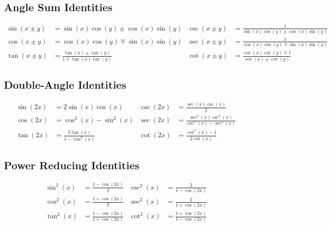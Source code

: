 \documentclass{article}
\begin{document}
\subsection{Angle Sum Identities}
\begin{align*}
	\sin{\left( x\pm y \right)} &= \sin{\left( x \right)} \cos{\left( y \right)} \pm \cos{\left( x \right)} \sin{\left( y \right)}           & \csc{\left( x\pm y \right)} &= \frac{1}{\sin{\left( x \right)} \cos{\left( y \right)} \pm \cos{\left( x \right)} \sin{\left( y \right)}} \\
	\cos{\left( x\pm y \right)} &= \cos{\left( x \right)} \cos{\left( y \right)} \mp \sin{\left( x \right)} \sin{\left( y \right)}           & \sec{\left( x\pm y \right)} &= \frac{1}{\cos{\left( x \right)} \cos{\left( y \right)} \mp \sin{\left( x \right)} \sin{\left( y \right)}} \\
	\tan{\left( x\pm y \right)} &= \frac{\tan{\left( x \right)}\pm\tan{\left( y \right)}}{1\mp \tan{\left( x \right)}\tan{\left( y \right)}} & \cot{\left( x\pm y \right)} &= \frac{\cot{\left( x \right)}\cot{\left( y \right)}\mp 1}{\cot{\left( x \right)}\pm\cot{\left( y \right)}}   
\end{align*}
\subsection{Double-Angle Identities}
\begin{align*}
	\sin{\left( 2x \right)} &= 2\sin{\left( x \right)}\cos{\left( x \right)}              & \csc{\left( 2x \right)} &= \frac{\sec{\left( x \right)}\csc{\left( x \right)}}{2} \\
	\cos{\left( 2x \right)} &= \cos^2{\left( x \right)} - \sin^2{\left( x \right)}        & \sec{\left( 2x \right)} &= \frac{\sec^2{\left( x \right)}\csc^2{\left( x \right)}}{\csc^2{\left( x \right)}-\sec^2{\left( x \right)}} \\
	\tan{\left( 2x \right)} &= \frac{2\tan{\left( x \right)}}{1-\tan^2{\left( x \right)}} & \cot{\left( 2x \right)} &= \frac{\cot^2{\left( x \right)}-1}{2\cot{\left( x \right)}} 
\end{align*}
\subsection{Power Reducing Identities}
\begin{align*}
	\sin^2{\left( x \right)} &= \frac{1-\cos{\left( 2x \right)}}{2}                         & \csc^2{\left( x \right)} &= \frac{2}{1-\cos{\left( 2x \right)}} \\
	\cos^2{\left( x \right)} &= \frac{1+\cos{\left( 2x \right)}}{2}                         & \sec^2{\left( x \right)} &= \frac{2}{1+\cos{\left( 2x \right)}} \\
	\tan^2{\left( x \right)} &= \frac{1-\cos{\left( 2x \right)}}{1+\cos{\left( 2x \right)}} & \cot^2{\left( x \right)} &= \frac{1+\cos{\left( 2x \right)}}{1-\cos{\left( 2x \right)}}
\end{align*}
\end{document}
